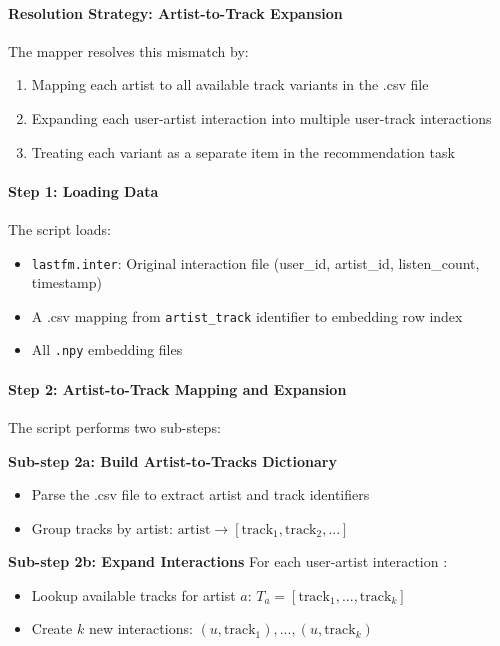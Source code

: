\paragraph{Resolution Strategy: Artist-to-Track Expansion}

The mapper resolves this mismatch by:
\begin{enumerate}
    \item Mapping each artist to all available track variants in the .csv file
    \item Expanding each user-artist interaction into multiple user-track interactions
    \item Treating each variant as a separate item in the recommendation task
\end{enumerate}



\paragraph{Step 1: Loading Data}
The script loads:
\begin{itemize}
    \item \texttt{lastfm.inter}: Original interaction file (user\_id, artist\_id, listen\_count, timestamp)
    \item A .csv mapping from \texttt{artist\_track} identifier to embedding row index
    \item All \texttt{.npy} embedding files
\end{itemize}

\paragraph{Step 2: Artist-to-Track Mapping and Expansion}
The script performs two sub-steps:

\textbf{Sub-step 2a: Build Artist-to-Tracks Dictionary}
\begin{itemize}
    \item Parse the .csv file to extract artist and track identifiers
    \item Group tracks by artist: $\text{artist} \rightarrow [\text{track}_1, \text{track}_2, ...]$
\end{itemize}

\textbf{Sub-step 2b: Expand Interactions}
For each user-artist interaction :
\begin{itemize}
    \item Lookup available tracks for artist $a$: $T_a = [\text{track}_1, ..., \text{track}_k]$
    \item Create $k$ new interactions: $(u, \text{track}_1), ..., (u, \text{track}_k)$
\end{itemize}

